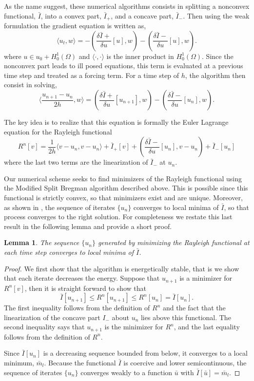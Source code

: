 \documentclass[11pt]{article}
\theoremstyle{plain}
\newtheorem{Lemma}{Lemma}[section]
\begin{document}
As the name suggest, these numerical algorithms consists in splitting a nonconvex functional, $\bar{I}$, into a convex part, $\bar{I}_+$, and a concave part, $\bar{I}_-$. Then using the weak formulation the gradient equation is written as,
\[ \langle u_t,w \rangle  = - ( \frac{\delta \bar{I}+}{\delta u}[u],w) -( \frac{\delta \bar{I}-}{\delta u}[u],w).   \]
where $u \in u_0 + H^1_0(\Omega)$ and $\langle \cdot, \cdot\rangle$ is the inner product in $H^1_0(\Omega)$. Since the nonconvex part leads to ill posed equations, this term is evaluated at a previous time step and treated as a forcing term. For a time step of $h$, the algorithm then consist in solving,
\[ \langle \frac{u_{n+1}-u_n}{2h}, w \rangle  = \left(  \frac{\delta \bar{I}+}{\delta u}[u_{n+1}],w \right) - \left ( \frac{\delta \bar{I}-}{\delta u}[u_n],w \right).\]

The key idea is to realize that this equation is formally the Euler Lagrange equation for the Rayleigh functional
\[ R^n[v] = \frac{1}{2h}\langle v-u_n, v - u_n \rangle + \bar{I}_+[v] + \left ( \frac{\delta \bar{I}-}{\delta u}[u_n],v-u_n \right) + \bar{I}_-[u_n] \]
where the last two terms are the linearization of $\bar{I}_-$ at $u_n$. 

Our numerical scheme seeks to find minimizers of the Rayleigh functional using the Modified Split Bregman algorithm described above. This is possible since this functional is strictly convex, so that minimizers exist and are unique. Moreover, as shown in \cite{glasner2016}, the sequence of iterates $\{u_n\}$ converges to local minima of $\bar{I}$, so that process converges to the right solution. For completeness we restate this last result in the following lemma and provide a short proof.

\begin{Lemma}\label{l:localmin}
The sequence $\{u_n\}$ generated by minimizing the Rayleigh functional at each time step converges to local minima of $\bar{I}$.
\end{Lemma}
\begin{proof}
We first show that the algorithm is energetically stable, that is we show that each iterate decreases the energy. Suppose that $u_{n+1}$ is a minimizer for $R^n[v]$, then it is straight forward to show that $$\bar{I}[u_{n+1}] \leq R^n[u_{n+1}] \leq R^n[u_n] = \bar{I}[u_n].$$
The first inequality follows from the definition of $R^n$ and the fact that the linearization of the concave part $I_-$ about $u_n$ lies above this functional. The second inequality says that $u_{n+1}$ is the minimizer for $R^n$, and the last equality follows from the definition of $R^n$.

Since $\bar{I}[u_n]$ is a decreasing sequence bounded from below, it converges to a local minimum, $\bar{m}_l$. Because the functional $\bar{I}$ is coercive and lower semicontinuous, the sequence of iterates $\{u_n\}$ converges weakly to a function $\bar{u}$ with $\bar{I}[\bar{u}] = \bar{m}_l$.
\end{proof}
\end{document}

